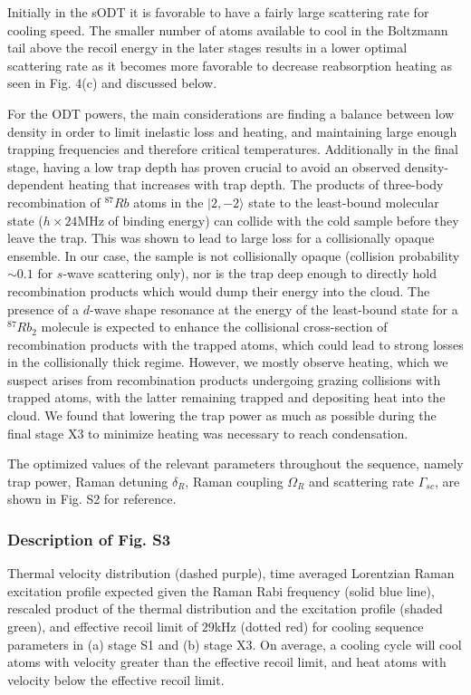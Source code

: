 \documentclass{article}
\begin{document}
Initially in the sODT it is favorable to have a fairly large scattering rate for cooling speed. The smaller number of atoms available to cool in the Boltzmann tail above the recoil energy in the later stages results in a lower optimal scattering rate as it becomes more favorable to decrease reabsorption heating as seen in Fig. 4(c) and discussed below.

For the ODT powers, the main considerations are finding a balance between low density in order to limit inelastic loss and heating, and maintaining large enough trapping frequencies and therefore critical temperatures. Additionally in the final stage, having a low trap depth has proven crucial to avoid an observed density-dependent heating that increases with trap depth. The products of three-body recombination of $^{87}Rb$ atoms in the $\vert 2, -2 \rangle$ state to the least-bound molecular state ($h \times 24$MHz of binding energy) can collide with the cold sample before they leave the trap. This was shown to lead to large loss for a collisionally opaque ensemble. In our case, the sample is not collisionally opaque (collision probability $\sim 0.1$ for $s$-wave scattering only), nor is the trap deep enough to directly hold recombination products which would dump their energy into the cloud. The presence of a $d$-wave shape resonance at the energy of the least-bound state for a $^{87}Rb_2$ molecule is expected to enhance the collisional cross-section of recombination products with the trapped atoms, which could lead to strong losses in the collisionally thick regime. However, we mostly observe heating, which we suspect arises from recombination products undergoing grazing collisions with trapped atoms, with the latter remaining trapped and depositing heat into the cloud. We found that lowering the trap power as much as possible during the final stage X3 to minimize heating was necessary to reach condensation.

The optimized values of the relevant parameters throughout the sequence, namely trap power, Raman detuning $\delta_R$, Raman coupling $\Omega_R$ and scattering rate $\Gamma_{sc}$, are shown in Fig. S2 for reference.

\subsubsection{Description of Fig. S3}
Thermal velocity distribution (dashed purple), time averaged Lorentzian Raman excitation profile expected given the Raman Rabi frequency (solid blue line), rescaled product of the thermal distribution and the excitation profile (shaded green), and effective recoil limit of $29$kHz (dotted red) for cooling sequence parameters in (a) stage S1 and (b) stage X3. On average, a cooling cycle will cool atoms with velocity greater than the effective recoil limit, and heat atoms with velocity below the effective recoil limit.
\end{document}
